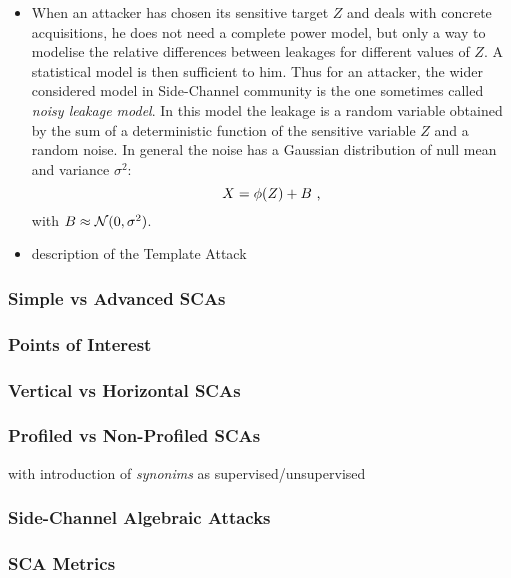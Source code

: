 \begin{itemize}
\item When an attacker has chosen its sensitive target $Z$ and deals with concrete acquisitions, he does not need a complete power model, but only  a way to modelise the relative differences between leakages for different values of $Z$. A statistical model is then sufficient to him. Thus for an attacker, the wider considered model in Side-Channel community is the one sometimes called \emph{noisy leakage model}. In this model the leakage is a random variable obtained by the sum of a deterministic function of the sensitive variable $Z$ and a random noise. In general the noise has a Gaussian distribution of null mean and variance $\sigma^2$:
\begin{equation}
X = \phi(Z) + B \mbox{ ,}
\end{equation}
with $B \approx \mathcal{N}(0,\sigma^2)$.

\item description of the Template Attack
\end{itemize}





\subsubsection{Simple vs Advanced SCAs}

\subsubsection{Points of Interest}

\subsubsection{Vertical vs Horizontal SCAs}
\subsubsection{Profiled vs Non-Profiled SCAs}
with introduction of \emph{synonims} as supervised/unsupervised
\subsubsection{Side-Channel Algebraic Attacks}

\subsubsection{SCA Metrics}



